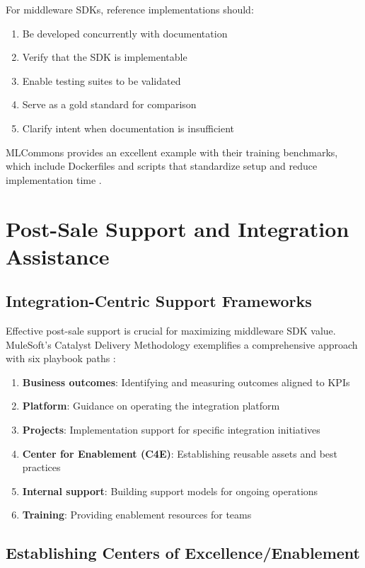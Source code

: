 \documentclass[11pt,a4paper]{article}
\begin{document}
For middleware SDKs, reference implementations should:
\begin{enumerate}
    \item Be developed concurrently with documentation
    \item Verify that the SDK is implementable
    \item Enable testing suites to be validated
    \item Serve as a gold standard for comparison
    \item Clarify intent when documentation is insufficient
\end{enumerate}

MLCommons provides an excellent example with their training benchmarks, which include Dockerfiles and scripts that standardize setup and reduce implementation time \cite{mlcommons2023}.

\section{Post-Sale Support and Integration Assistance}

\subsection{Integration-Centric Support Frameworks}

Effective post-sale support is crucial for maximizing middleware SDK value. MuleSoft's Catalyst Delivery Methodology exemplifies a comprehensive approach with six playbook paths \cite{mulesoft2023}:

\begin{enumerate}
    \item \textbf{Business outcomes}: Identifying and measuring outcomes aligned to KPIs
    \item \textbf{Platform}: Guidance on operating the integration platform
    \item \textbf{Projects}: Implementation support for specific integration initiatives
    \item \textbf{Center for Enablement (C4E)}: Establishing reusable assets and best practices
    \item \textbf{Internal support}: Building support models for ongoing operations
    \item \textbf{Training}: Providing enablement resources for teams
\end{enumerate}

\subsection{Establishing Centers of Excellence/Enablement}
\end{document}
